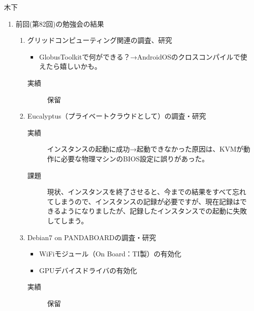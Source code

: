 \documentclass[mingoth,a4paper]{jsarticle}
\begin{document}
\begin{prework}{ 木下 }
\begin{enumerate}
  \item 前回(第82回)の勉強会の結果

        \begin{enumerate}
         \item グリッドコンピューティング関連の調査、研究
               \begin{itemize}
                \item GlobusToolkitで何ができる？→AndroidOSのクロスコンパイルで使えたら嬉しいかも。
               \end{itemize}
               \begin{description}
                \item[実績] 保留
               \end{description}
         \item Eucalyptus（プライベートクラウドとして）の調査・研究
               \begin{description}
                \item[実績] インスタンスの起動に成功→起動できなかった原因は、KVMが動作に必要な物理マシンのBIOS設定に誤りがあった。
                \item[課題] 現状、インスタンスを終了させると、今までの結果をすべて忘れてしまうので、インスタンスの記録が必要ですが、現在記録はできるようになりましたが、記録したインスタンスでの起動に失敗してしまう。
               \end{description}
         \item Debian7 on PANDABOARDの調査・研究
               \begin{itemize}
                \item WiFiモジュール（On Board：TI製）の有効化
                \item GPUデバイスドライバの有効化
               \end{itemize}
               \begin{description}
                \item[実績] 保留
               \end{description}
        \end{enumerate}
 \end{enumerate}

\end{prework}
\end{document}
